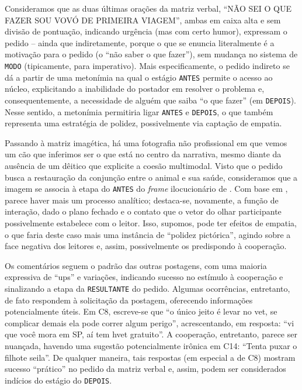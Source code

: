 \documentclass{textolivre-html}
\begin{document}
Consideramos que as duas últimas orações da matriz verbal, “NÃO SEI O QUE FAZER SOU VOVÓ DE PRIMEIRA VIAGEM”, ambas em caixa alta e sem divisão de pontuação, indicando urgência (mas com certo humor), expressam o pedido – ainda que indiretamente, porque o que se enuncia literalmente é a motivação para o pedido (o “não saber o que fazer”), sem mudança no sistema de \texttt{MODO} (tipicamente, para imperativo). Mais especificamente, o pedido indireto se dá a partir de uma metonímia na qual o estágio \texttt{ANTES} permite o acesso ao núcleo, explicitando a inabilidade do postador em resolver o problema e, consequentemente, a necessidade de alguém que saiba “o que fazer” (em \texttt{DEPOIS}). Nesse sentido, a metonímia permitiria ligar \texttt{ANTES} e \texttt{DEPOIS}, o que também representa uma estratégia de polidez, possivelmente via captação de empatia.

Passando à matriz imagética, há uma fotografia não profissional em que vemos um cão que inferimos ser o que está no centro da narrativa, mesmo diante da ausência de um dêitico que explicite a coesão multimodal. Visto que o pedido busca a restauração da conjunção entre o animal e sua saúde, consideramos que a imagem se associa à etapa do \texttt{ANTES} do \textit{frame} ilocucionário de \textcite{panther2017}. Com base em \textcite{kress2006}, parece haver mais um processo analítico; destaca-se, novamente, a função de interação, dado o plano fechado e o contato que o vetor do olhar participante possivelmente estabelece com o leitor. Isso, supomos, pode ter efeitos de empatia, o que faria deste caso mais uma instância de “polidez pictórica”, agindo sobre a face negativa dos leitores e, assim, possivelmente os predispondo à cooperação.

Os comentários seguem o padrão das outras postagens, com uma maioria expressiva de “ups” e variações, indicando sucesso no estímulo à cooperação e sinalizando a etapa da \texttt{RESULTANTE} do pedido. Algumas ocorrências, entretanto, de fato respondem à solicitação da postagem, oferecendo informações potencialmente úteis. Em C8, escreve-se que “o único jeito é levar no vet, se complicar demais ela pode correr algum perigo”, acrescentando, em resposta: “vi que você mora em SP, aí tem hvet gratuito”. A cooperação, entretanto, parece ser nuançada, havendo uma sugestão potencialmente irônica em C14: “Tenta puxar o filhote seila”. De qualquer maneira, tais respostas (em especial a de C8) mostram sucesso “prático” no pedido da matriz verbal e, assim, podem ser considerados indícios do estágio do \texttt{DEPOIS}.
\end{document}
